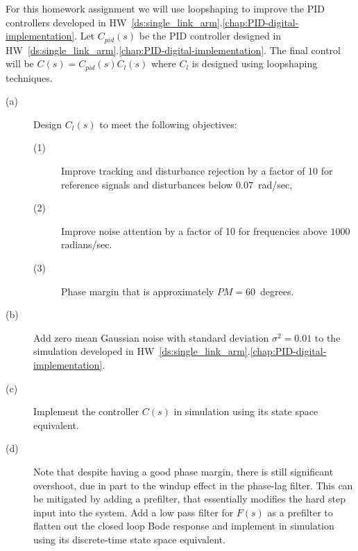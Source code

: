 
For this homework assignment we will use loopshaping to improve the PID controllers developed in HW~\ref{ds:single_link_arm}.\ref{chap:PID-digital-implementation}.  Let $C_{pid}(s)$ be the PID controller designed in HW~\ref{ds:single_link_arm}.\ref{chap:PID-digital-implementation}.  The final control will be $C(s) = C_{pid}(s)C_{l}(s)$ where $C_l$ is designed using loopshaping techniques.
\begin{description}
\item[(a)]  Design $C_l(s)$ to meet the following objectives:
	\begin{description}
	\item[(1)] Improve tracking and disturbance rejection by a factor of 10 for reference signals and disturbances below $0.07$~rad/sec, 
	\item[(2)] Improve noise attention by a factor of 10 for frequencies above $1000$ radians/sec.
	\item[(3)] Phase margin that is approximately $PM=60$~degrees.
	\end{description}
\item[(b)] Add zero mean Gaussian noise with standard deviation $\sigma^2=0.01$ to the simulation developed in HW~\ref{ds:single_link_arm}.\ref{chap:PID-digital-implementation}.
\item[(c)] Implement the controller $C(s)$ in simulation using its state space equivalent.
\item[(d)] Note that despite having a good phase margin, there is still significant overshoot, due in part to the windup effect in the phase-lag filter.  This can be mitigated by adding a prefilter, that essentially modifies the hard step input into the system.  Add a low pass filter for $F(s)$ as a prefilter to flatten out the closed loop Bode response and implement in simulation using its discrete-time state space equivalent.
\end{description}
